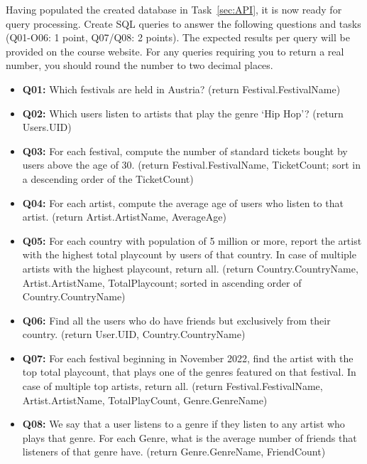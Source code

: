 \documentclass[
        a4paper,
        pdftex,
        english, 
        oneside,%
        listof=totoc,%
        bibliography=totoc, %
        titlepage,
        abstracton 
]{scrartcl} %
\newcommand\todo[1]{\textcolor{red}{#1}}
\begin{document}
Having populated the created database in Task~\ref{sec:API}, it is now ready for query processing. Create SQL queries to answer the following questions and tasks (Q01-O06: 1 point, Q07/Q08: 2 points). The expected results per query will be provided on the course website. For any queries requiring you to return a real number, you should round the number to two decimal places.
\begin{itemize}
\item \textbf{Q01:} Which festivals are held in Austria? (return Festival.FestivalName)

\item \textbf{Q02:} Which users listen to artists that play the genre `Hip Hop'? (return Users.UID)

\item \textbf{Q03:} For each festival, compute the number of standard tickets bought by users above the age of 30. (return Festival.FestivalName, TicketCount; sort in a descending order of the TicketCount)

\item \textbf{Q04:} For each artist, compute the average age of users who listen to that artist. (return Artist.ArtistName, AverageAge)

\item \textbf{Q05:} For each country with population of 5 million or more, report the artist with the highest total playcount by users of that country. In case of multiple artists with the highest playcount, return all. (return Country.CountryName, Artist.ArtistName, TotalPlaycount; sorted in ascending order of Country.CountryName)


\item \textbf{Q06:} Find all the users who do have friends but exclusively from their country. (return User.UID, Country.CountryName)

\item \textbf{Q07:} For each festival beginning in November 2022, find the artist with the top total playcount, that plays one of the genres featured on that festival. In case of multiple top artists, return all. (return Festival.FestivalName, Artist.ArtistName, TotalPlayCount, Genre.GenreName)


\item \textbf{Q08:} We say that a user listens to a genre if they listen to any artist who plays that genre. For each Genre, what is the average number of friends that listeners of that genre have. (return Genre.GenreName, FriendCount)

\end{itemize}
\end{document}

